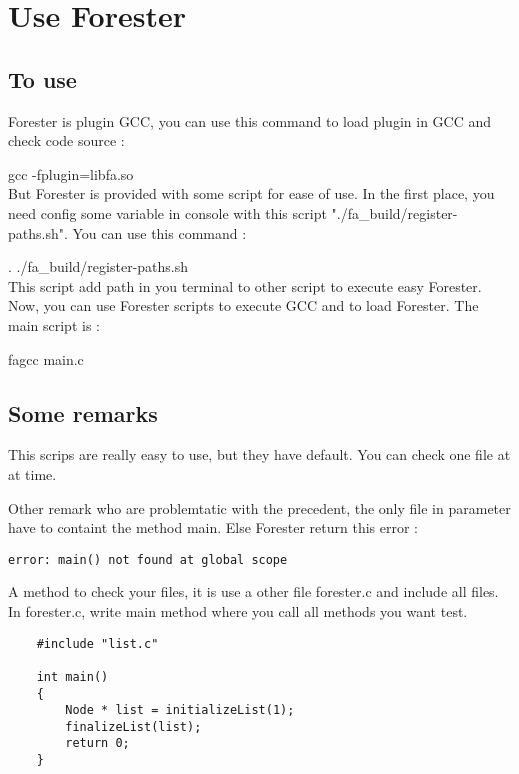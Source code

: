 \section {Use Forester}

	\subsection{To use}

Forester is plugin GCC, you can use this command to load plugin in GCC and check code source :

gcc -fplugin=libfa.so
\\

But Forester is provided with some script for ease of use. In the first place, you need config some variable in console with this script "./fa\_build/register-paths.sh". You can use this command :

. ./fa\_build/register-paths.sh
\\

This script add path in you terminal to other script to execute easy Forester. Now, you can use Forester scripts to execute GCC and to load Forester. The main script is :

fagcc main.c
\\

	\subsection{Some remarks}
	
This scrips are really easy to use, but they have default. You can check one file at at time.

Other remark who are problemtatic with the precedent, the only file in parameter have to containt the method main. Else Forester return this error :

\lstset{language=C, numbers=left, frame=shadowbox}
\begin{lstlisting}
error: main() not found at global scope
\end{lstlisting}
\bigskip

A method to check your files, it is use a other file forester.c and include all files. In forester.c, write main method where you call all methods you want test.

\lstset{language=C, numbers=left, frame=shadowbox}
\begin{lstlisting}
	#include "list.c"

	int main()
	{
		Node * list = initializeList(1);
		finalizeList(list);
		return 0;
	}
\end{lstlisting}
\bigskip